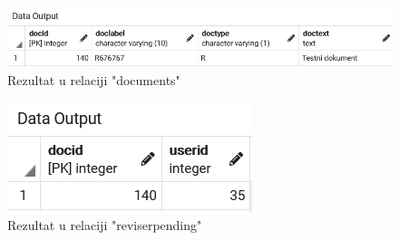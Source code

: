 \begin{figure}[H]
	\centering
	\includegraphics[scale=0.5]{./slike/baza6doc.png}
	\caption{Rezultat u relaciji "documents"}
	\label{fig:BAZA6b}
\end{figure}
\begin{figure}[H]
	\centering
	\includegraphics[scale=0.5]{./slike/baza6rp.png}
	\caption{Rezultat u relaciji "reviserpending"}
	\label{fig:BAZA6c}
\end{figure}


